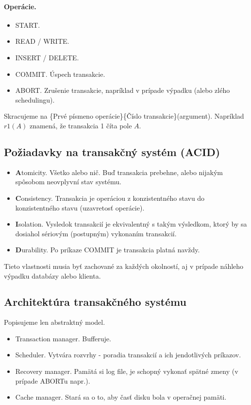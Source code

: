 \documentclass[10pt,a4paper]{article}
\begin{document}
\paragraph{Operácie.}
\begin{itemize}
\item START.
\item READ / WRITE.
\item INSERT / DELETE.
\item COMMIT. Úspech transakcie. 
\item ABORT. Zrušenie transakcie, napríklad v prípade výpadku (alebo zlého schedulingu).  
\end{itemize}

Skracujeme na \{Prvé písmeno operácie\}\{Číslo transakcie\}(argument). Napríklad $r1(A)$ znamená, že transakcia 1 číta pole $A$. 

\subsection{Požiadavky na transakčný systém (ACID)}

\begin{itemize}
\item {\bf A}tomicity. Všetko alebo nič. Buď transakcia prebehne, alebo nijakým spôsobom neovplyvní stav systému. 
\item {\bf C}onsistency. Transakcia je operáciou z konzistentného stavu do konzistentného stavu (uzavretosť operácie). 
\item {\bf I}solation. Vysledok transakcií je ekvivalentný s takým výsledkom, ktorý by sa dosiahol sériovým (postupným) vykonaním transakcií. 
\item {\bf D}urability. Po príkaze COMMIT je transakcia platná navždy. 
\end{itemize}

Tieto vlastnosti musia byť zachované za každých okolností, aj v prípade náhleho výpadku databázy alebo klienta. 

\subsection{Architektúra transakčného systému}

Popisujeme len abstraktný model. 

\begin{itemize}
\item Transaction manager. Bufferuje. 
\item Scheduler. Vytvára rozvrhy - poradia transakcií a ich jendotlivých príkazov. 
\item Recovery manager. Pamätá si log file, je schopný vykonať spätné zmeny (v prípade ABORTu napr.).
\item Cache manager. Stará sa o to, aby časť disku bola v operačnej pamäti.  
\end{itemize}
\end{document}
